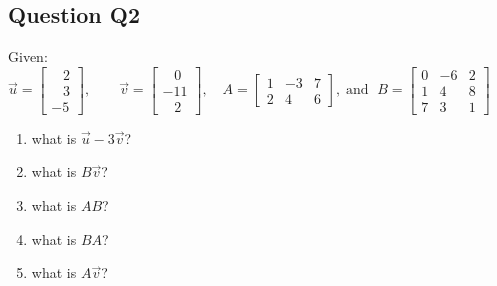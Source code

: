 \documentclass[a4paper,11pt,reqno]{amsart}
\numberwithin{equation}{section}
\begin{document}
\subsection*{Question Q2}

Given:\(\vec{u}=\begin{bmatrix}\;\;\;2\\ \;\;\;3\\-5\end{bmatrix},\qquad \vec{v}= \begin{bmatrix}\;\;\;0\\ -11\\\;\;\;2\end{bmatrix}, \quad A=\left[\begin{matrix}1& -3& 7\\ 2& 4& 6 \end{matrix}\right], \;\text{and }\; B=\left[\begin{matrix}0& -6& 2\\ 1& 4& 8\\7 & 3 & 1 \end{matrix}\right]\)
\begin{enumerate}[a]
    \item what is \(\vec{u}-3\vec{v}\)?
    \item what is \(B\vec{v}\)?
    \item what is \(AB\)?
    \item what is \(BA\)?
    \item what is \(A\vec{v}\)?
\end{enumerate}
\end{document}
